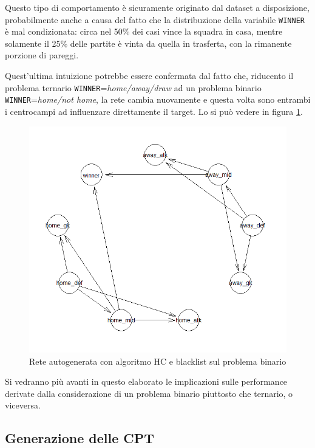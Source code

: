 \documentclass[hidelinks, 12pt]{article}
\begin{document}
Questo tipo di comportamento è sicuramente originato dal dataset a disposizione, probabilmente anche a causa del fatto che la distribuzione della variabile \texttt{WINNER} è mal condizionata: circa nel 50\% dei casi vince la squadra in casa, mentre solamente il 25\% delle partite è vinta da quella in trasferta, con la rimanente porzione di pareggi.

Quest'ultima intuizione potrebbe essere confermata dal fatto che, riducento il problema ternario \texttt{WINNER}=\textit{home/away/draw} ad un problema binario \texttt{WINNER}=\textit{home/not home}, la rete cambia nuovamente e questa volta sono entrambi i centrocampi ad influenzare direttamente il target. Lo si può vedere in figura \ref{img:hc-bin-bl}.

\begin{figure}[H]
	\centering
	\includegraphics[scale=0.75]{images/05_02_hc_bin_bl.png}
	\caption[Rete autogenerata con algoritmo HC e blacklist sul problema binario]{Rete autogenerata con algoritmo HC e blacklist sul problema binario}
	\label{img:hc-bin-bl}
\end{figure}

Si vedranno più avanti in questo elaborato le implicazioni sulle performance derivate dalla considerazione di un problema binario piuttosto che ternario, o viceversa.


\subsection{Generazione delle CPT}
\end{document}
